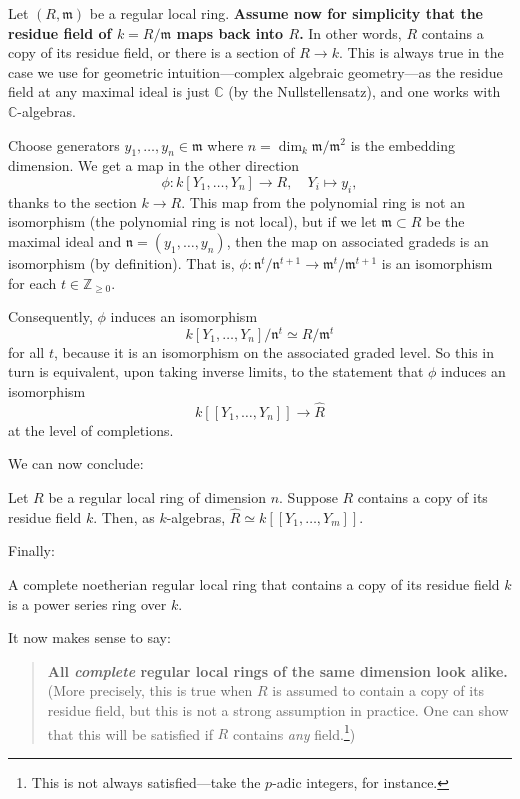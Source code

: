 Let $(R, \mathfrak{m})$ be a regular local ring.
\textbf{Assume now for simplicity that the residue field of $k=R/\mathfrak{m}$
maps back into $R$.} In other words, $R$ contains a copy of its residue field,
or there is a section of $R \to k$.  This is always true in the case we
use for geometric intuition---complex algebraic geometry---as the
residue field at any maximal ideal is just $\mathbb{C}$ (by the
Nullstellensatz), and one works with $\mathbb{C}$-algebras.

Choose generators $y_1, \dots, y_n \in
\mathfrak{m}$ where $n = \dim_k \mathfrak{m}/\mathfrak{m}^2$ is the embedding
dimension. We get a map in the other direction
\[ \phi:k[Y_1, \dots, Y_n] \to R, \quad Y_i \mapsto y_i,  \]
thanks to the section $k \to R$. This map from the polynomial ring is not
an isomorphism (the polynomial ring is not local), but if we let $\mathfrak{m} \subset R$ be the maximal ideal
and $\mathfrak{n} = (y_1, \dots, y_n)$,  then the map on associated gradeds is
an isomorphism (by definition). That is, $\phi:
\mathfrak{n}^t/\mathfrak{n}^{t+1} \to \mathfrak{m}^t/\mathfrak{m}^{t+1}$ is an
isomorphism for each $t \in \mathbb{Z}_{\geq 0}$. 

Consequently, $\phi$ induces an isomorphism
\[ k[Y_1, \dots,Y_n]/\mathfrak{n}^t \simeq R/\mathfrak{m}^t  \]
for all $t$, because it is an isomorphism on the associated graded level.
So this in turn is equivalent, upon taking inverse limits, to the statement that
$\phi$ induces an isomorphism
\[ k[[Y_1, \dots, Y_n ]] \to \hat{R} \]
at the level of completions.

We can now conclude:
\begin{theorem} 
Let $R$ be a regular local ring of dimension $n$. Suppose $R$ contains a copy
of its residue field $k$. Then, as $k$-algebras, $\hat{R} \simeq k[[Y_1, \dots, Y_m]]$.
\end{theorem} 

Finally:
\begin{corollary} 
A complete noetherian regular local ring that contains a copy of its residue
field $k$ is a power series ring over $k$.
\end{corollary} 

It now makes sense to say:
\begin{quote}
\textbf{All \emph{complete} regular local rings of the same dimension look
alike.} (More precisely, this is true when $R$ is assumed to contain a copy of
its residue field, but this is not a strong assumption in practice. One can
show that this will be satisfied if $R$ contains \emph{any}
field.\footnote{This is not always satisfied---take the $p$-adic integers, for instance.})
\end{quote}

